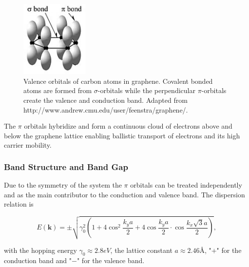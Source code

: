 \begin{figure}[!h]
  \centering
  \includegraphics[width=0.3\textwidth]{./images/orbitals.jpg}
  \caption{Valence orbitals of carbon atoms in graphene. Covalent bonded atoms are formed from $\sigma$-orbitals while the perpendicular $\pi$-orbitals create the valence and conduction band. Adapted from http://www.andrew.cmu.edu/user/feenstra/graphene/\mcite.}
\end{figure}

The $\pi$ orbitals hybridize and form a continuous cloud of electrons above and below the graphene lattice enabling ballistic transport of electrons and its high carrier mobility.

\subsubsection{Band Structure and Band Gap}

Due to the symmetry of the system the $\pi$ orbitals can be treated independently and as the main contributor to the conduction and valence band. The dispersion relation is\mcite

\begin{equation}
  E(\mathbf{k})=\pm\sqrt{\gamma_0^2\left(1+4\cos^2\frac{k_ya}{2}+4\cos\frac{k_ya}{2}\cdot\cos\frac{k_x\sqrt{3}a}{2}\right)},
  \label{dispersion}
\end{equation}

with the hopping energy $\gamma_0\approx2.8eV$, the lattice constant $a\approx2.46Å$, "$+$" for the conduction band and "$-$" for the valence band.

